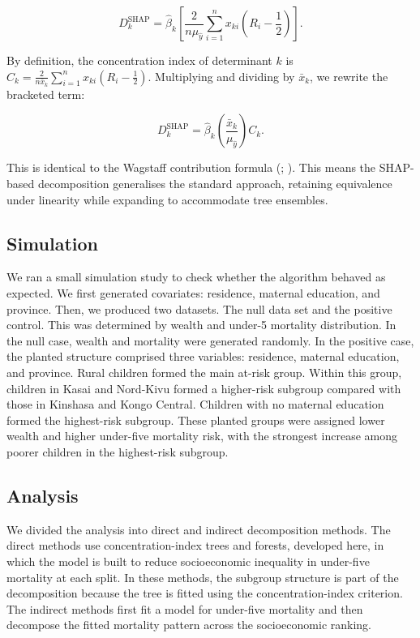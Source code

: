 \documentclass[
  11pt,
  a4paper,
]{article}
\begin{document}
\[
D_k^{\text{SHAP}} = \hat{\beta}_k \left[ \frac{2}{n\mu_{\hat{y}}} \sum_{i=1}^n x_{ki} \left(R_i - \frac{1}{2}\right) \right].
\]

By definition, the concentration index of determinant \(k\) is
\(C_k = \frac{2}{n\bar{x}_k}\sum_{i=1}^{n} x_{ki}(R_i - \frac{1}{2})\).
Multiplying and dividing by \(\bar{x}_k\), we rewrite the bracketed
term:

\[
D_k^{\text{SHAP}} = \hat{\beta}_k \left( \frac{\bar{x}_k}{\mu_{\hat{y}}} \right) C_k.
\]

This is identical to the Wagstaff contribution formula
(; ). This means the SHAP-based decomposition
generalises the standard approach, retaining equivalence under linearity
while expanding to accommodate tree ensembles.

\subsection{Simulation}\label{sec-simulation-study}

We ran a small simulation study to check whether the algorithm behaved
as expected. We first generated covariates: residence, maternal
education, and province. Then, we produced two datasets. The null data
set and the positive control. This was determined by wealth and under-5
mortality distribution. In the null case, wealth and mortality were
generated randomly. In the positive case, the planted structure
comprised three variables: residence, maternal education, and province.
Rural children formed the main at-risk group. Within this group,
children in Kasai and Nord-Kivu formed a higher-risk subgroup compared
with those in Kinshasa and Kongo Central. Children with no maternal
education formed the highest-risk subgroup. These planted groups were
assigned lower wealth and higher under-five mortality risk, with the
strongest increase among poorer children in the highest-risk subgroup.

\subsection{Analysis}\label{sec-analysis-methods}

We divided the analysis into direct and indirect decomposition methods.
The direct methods use concentration-index trees and forests, developed
here, in which the model is built to reduce socioeconomic inequality in
under-five mortality at each split. In these methods, the subgroup
structure is part of the decomposition because the tree is fitted using
the concentration-index criterion. The indirect methods first fit a
model for under-five mortality and then decompose the fitted mortality
pattern across the socioeconomic ranking.
\end{document}
